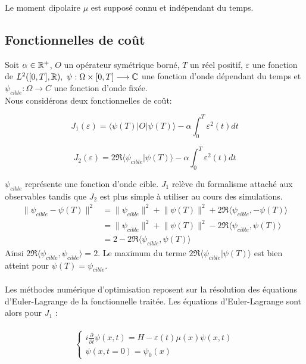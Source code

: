 Le moment dipolaire $\mu$ est supposé connu et indépendant du temps.

\subsection{Fonctionnelles de coût}
Soit $\alpha \in \mathbb R^+$, $O$ un opérateur symétrique borné, $T$ un réel positif, $\varepsilon$ une fonction de $L^2 ([0, T ], \mathbb R),\  \psi : \Omega \times [0, T ] \longrightarrow \mathbb C$ une fonction d’onde dépendant du temps et $\psi_{cible} : \Omega \longrightarrow C$ une fonction d’onde fixée.
\\Nous considérons deux fonctionnelles de coût:

\begin{equation}
J_1(\varepsilon) = \langle \psi(T)|O|\psi(T) \rangle - \alpha \int_0^T \varepsilon^2(t)dt
\end{equation}

\begin{equation}
J_2(\varepsilon) = 2\Re\langle \psi_{cible}|\psi(T)\rangle - \alpha \int_0^T \varepsilon^2(t)dt
\end{equation}

$\psi_{cible}$ représente une fonction d’onde cible. $J_1$ relève du formalisme attaché aux observables tandis que $J_2$ est plus simple à utiliser au cours des simulations.
\begin{align*}
\lVert \psi_{cible} - \psi(T)\rVert^2 &= \lVert \psi_{cible} \rVert^2 + \lVert \psi(T)\rVert^2+ 2 \Re \langle \psi_{cible}, - \psi(T) \rangle\\
&=\lVert \psi_{cible} \rVert^2 + \lVert \psi(T)\rVert^2- 2 \Re \langle \psi_{cible}, \psi(T) \rangle\\
&= 2 - 2\Re\langle \psi_{cible}, \psi(T) \rangle
\end{align*}
Ainsi $2\Re \langle \psi_{cible},\psi_{cible} \rangle = 2$. Le maximum du terme $2\Re\langle \psi_{cible}|\psi(T)\rangle$ est bien atteint pour $\psi(T) = \psi_{cible}$.\\\\
Les méthodes numérique d’optimisation reposent sur la résolution des équations d’Euler-Lagrange de la fonctionnelle traitée. Les équations d'Euler-Lagrange sont alors pour $J_1$ :\\\\

\begin{equation}
\begin{cases}
i \frac{\partial}{\partial t} \psi (x,t) = H - \varepsilon(t)\mu(x)\psi(x,t)\\
\psi(x,t=0)=\psi_0(x)
\end{cases}
\end{equation}

